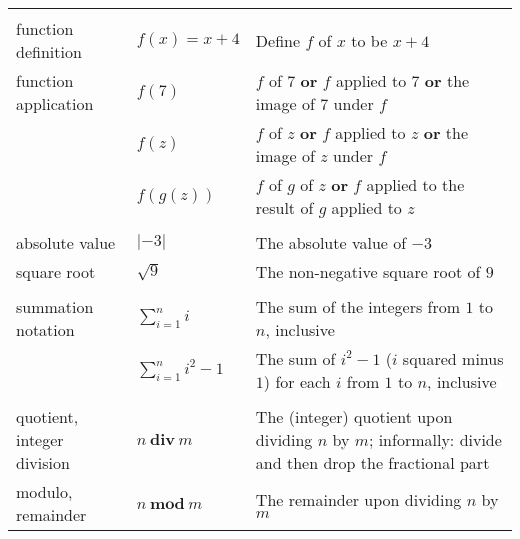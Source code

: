 \documentclass[12pt, oneside]{article}
\begin{document}
\begin{center}
\begin{tabular}{|llp{9cm}|}
&&\\
function definition & $f(x) = x + 4$ & Define $f$ of $x$ to be $x + 4$ \\
function application & $f(7)$ & $f$ of $7$ {\bf or} $f$ applied to $7$ {\bf or} the image of $7$ under $f$\\
                     & $f(z)$ & $f$ of $z$ {\bf or} $f$ applied to $z$ {\bf or} the image of $z$ under $f$\\
                     & $f(g(z))$ & $f$ of $g$ of $z$ {\bf or} $f$ applied to the result of $g$ applied to $z$ \\
&&\\
absolute value & $\lvert -3 \rvert$ & The absolute value of $-3$ \\
square root & $\sqrt{9}$ & The non-negative square root of $9$ \\
&&\\
summation notation & $\displaystyle \sum_{i=1}^n i$ & The sum of the integers from $1$ to $n$, inclusive \\
                    & $\displaystyle \sum_{i=1}^n i^2 - 1$ & The sum of $i^2 - 1$ ($i$ squared minus $1$) for each $i$ from $1$ to $n$, inclusive \\
&&\\
quotient, integer division & $n~\textbf{div}~m$ & The (integer) quotient upon dividing $n$ by $m$; informally: divide and then 
drop the fractional part\\
modulo, remainder & $n~\textbf{mod}~m$ & The remainder upon dividing $n$ by $m$ \\

\hline
\end{tabular}
\end{center} \vfill
\end{document}
